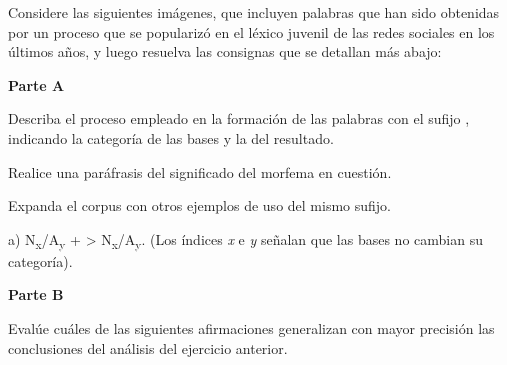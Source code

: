 \begin{ejercicio}\label{ej:04-ardo}
Considere las siguientes imágenes, que incluyen palabras que han sido obtenidas
por un proceso que se popularizó en el léxico juvenil de las redes sociales en
los últimos años, y luego resuelva las consignas que se detallan más abajo:


\textbf{Parte A}
\begin{consignas}
  \item Describa el proceso empleado en la formación de las palabras con el
        sufijo , indicando la categoría de las bases y la del
        resultado.
  \item Realice una paráfrasis del significado del morfema en cuestión.
  \item Expanda el corpus con otros ejemplos de uso del mismo sufijo.
\end{consignas}

\begin{resuelto}
a) N\textsubscript{x}/A\textsubscript{y} +  >
N\textsubscript{x}/A\textsubscript{y}. (Los índices \textit{x} e \textit{y}
señalan que las bases no cambian su categoría).
\end{resuelto}

\textbf{Parte B}

Evalúe cuáles de las siguientes afirmaciones generalizan con mayor precisión las
conclusiones del análisis del ejercicio anterior.


\end{ejercicio}
